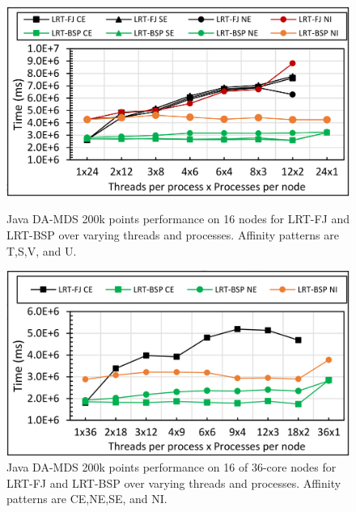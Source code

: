 \documentclass[10pt, conference, compsocconf]{IEEEtran}
\begin{document}
\begin{figure}[!htb]
	\begin{minipage}{0.49\textwidth}
        \centering
        \includegraphics[width=1\columnwidth]{images/fig_damds_200k_binding_patterns}
        \caption{Java DA-MDS 200k points performance on 16 nodes for \ac{LRT-FJ} and \ac{LRT-BSP} over varying threads and processes. Affinity patterns are T,S,V, and U.}
        \label{fig:fig_damds_200k_binding_patterns}
    \end{minipage}
    \hspace{1.4mm}
    \begin{minipage}{0.49\textwidth}
        \centering
        \includegraphics[width=1\columnwidth]{images/fig_damds_200k_binding_patterns_on_36core_nodes}
        \caption{Java DA-MDS 200k points performance on 16 of 36-core nodes for \ac{LRT-FJ} and \ac{LRT-BSP} over varying threads and processes. Affinity patterns are CE,NE,SE, and NI.}
        \label{fig:fig_damds_200k_binding_patterns_on_36core_nodes}
    \end{minipage}
\end{figure}
\end{document}
